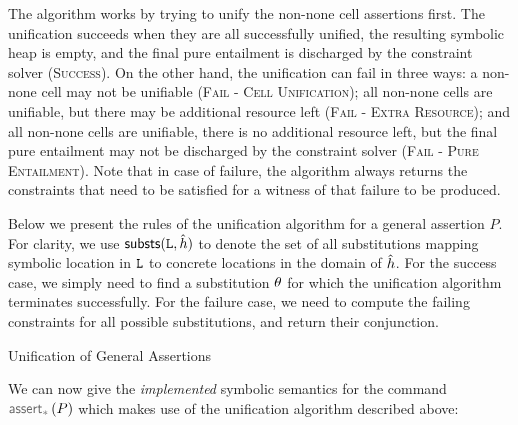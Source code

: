 The algorithm works by trying to unify the non-none cell assertions first. 
The unification succeeds when they are all successfully unified, the resulting symbolic heap is empty, 
and the final pure entailment is discharged by the constraint solver (\textsc{Success}). 
On the other hand, the unification can fail in three
ways: 
a non-none cell may not be unifiable (\textsc{Fail - Cell Unification}); 
all non-none cells are unifiable, but there may be additional resource left (\textsc{Fail - Extra Resource}); 
and all non-none cells are unifiable, there is no additional resource left, but the final
pure entailment may not be discharged by the constraint solver (\textsc{Fail - Pure Entailment}). 
Note that in case of failure, the algorithm 
always returns the constraints that need to be satisfied for a witness of that failure to be produced. 

Below we present the rules of the unification algorithm for a general assertion $P$.
For clarity, we use ${\sf substs}(\mathtt{L}, \hat{h})$ to denote the set of all substitutions
mapping symbolic location in $\mathtt{L}$ to concrete locations in the domain of $\hat{h}$. 
%
For the success case, we simply need to find a substitution $\theta$ 
for which the unification algorithm terminates successfully. For the failure case, 
we need to compute the failing constraints for all possible substitutions, and 
return their conjunction. 


\begin{display}{Unification of General Assertions}
%
 \qquad
 \end{display}

We can now give the \emph{implemented} symbolic semantics for the command $\sepassert(P)$ 
which makes use of the unification algorithm described above: 
{\small {}}


